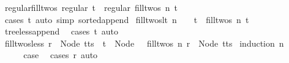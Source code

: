 \begin{isabellebody}
\endisatagproof
{\isafoldproof}%
%
\isadelimproof
\isanewline
%
\endisadelimproof
\isanewline
{}\isamarkupfalse%
\ regular{\isacharunderscore}{\kern0pt}fill{\isacharunderscore}{\kern0pt}twos{\isacharcolon}{\kern0pt}\ {\isachardoublequoteopen}regular\ t\ {\isasymLongrightarrow}\ regular\ {\isacharparenleft}{\kern0pt}fill{\isacharunderscore}{\kern0pt}twos\ n\ t{\isacharparenright}{\kern0pt}{\isachardoublequoteclose}\isanewline
%
\isadelimproof
\ \ %
\endisadelimproof
%
\isatagproof
{}\isamarkupfalse%
\ {\isacharparenleft}{\kern0pt}cases\ t{\isacharparenright}{\kern0pt}\ {\isacharparenleft}{\kern0pt}auto\ simp{\isacharcolon}{\kern0pt}\ sorted{\isacharunderscore}{\kern0pt}append{\isacharparenright}{\kern0pt}%
\endisatagproof
{\isafoldproof}%
%
\isadelimproof
\isanewline
%
\endisadelimproof
\isanewline
{}\isamarkupfalse%
\ fill{\isacharunderscore}{\kern0pt}twos{\isacharunderscore}{\kern0pt}lt{\isacharcolon}{\kern0pt}\ {\isachardoublequoteopen}n\ {\isasymnoteq}\ {}\ {\isasymLongrightarrow}\ t\ {\isacharless}{\kern0pt}\ fill{\isacharunderscore}{\kern0pt}twos\ n\ t{\isachardoublequoteclose}\isanewline
%
\isadelimproof
\ \ %
\endisadelimproof
%
\isatagproof
{}\isamarkupfalse%
\ tree{\isacharunderscore}{\kern0pt}less{\isacharunderscore}{\kern0pt}append\ \isamarkupfalse%
\ {\isacharparenleft}{\kern0pt}cases\ t{\isacharparenright}{\kern0pt}\ auto%
\endisatagproof
{\isafoldproof}%
%
\isadelimproof
\isanewline
%
\endisadelimproof
\isanewline
{}\isamarkupfalse%
\ fill{\isacharunderscore}{\kern0pt}twos{\isacharunderscore}{\kern0pt}less{\isacharcolon}{\kern0pt}\ {\isachardoublequoteopen}r\ {\isacharless}{\kern0pt}\ Node\ {\isacharparenleft}{\kern0pt}t{\isacharhash}{\kern0pt}ts{\isacharparenright}{\kern0pt}\ {\isasymLongrightarrow}\ t\ {\isasymnoteq}\ Node\ {\isacharbrackleft}{\kern0pt}{\isacharbrackright}{\kern0pt}\ {\isasymLongrightarrow}\ fill{\isacharunderscore}{\kern0pt}twos\ n\ r\ {\isacharless}{\kern0pt}\ Node\ {\isacharparenleft}{\kern0pt}t{\isacharhash}{\kern0pt}ts{\isacharparenright}{\kern0pt}{\isachardoublequoteclose}\isanewline
%
\isadelimproof
%
\endisadelimproof
%
\isatagproof
{}\isamarkupfalse%
\ {\isacharparenleft}{\kern0pt}induction\ n{\isacharparenright}{\kern0pt}\isanewline
\ \ \isamarkupfalse%
\ {}\isanewline
\ \ \isamarkupfalse%
\ \isamarkupfalse%
\ {\isacharquery}{\kern0pt}case\ \isamarkupfalse%
\ {\isacharparenleft}{\kern0pt}cases\ r{\isacharparenright}{\kern0pt}\ auto\isanewline

\end{isabellebody}
